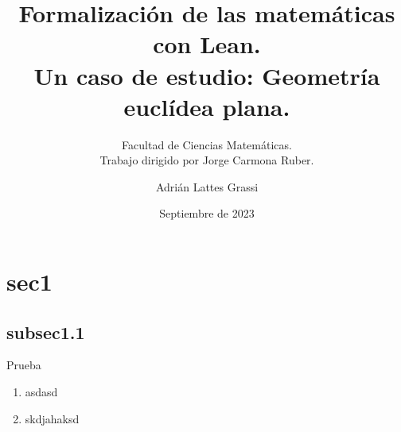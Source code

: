 \documentclass{beamer}
\title{Formalización de las matemáticas con Lean.\\ Un caso de estudio: Geometría euclídea plana.}
\author{Adrián Lattes Grassi}
\date{Septiembre de 2023}
\subtitle{Facultad de Ciencias Matemáticas.\\Trabajo dirigido por Jorge Carmona Ruber.}
\begin{document}
\frame{\titlepage}

\section{sec1}
\subsection{subsec1.1}
\begin{frame}
	Prueba
	\pause
	\vspace{.1em}
	\begin{center}
		\begin{multicols}{2}
			\begin{enumerate}
				\item asdasd
				\item skdjahaksd
			\end{enumerate}
		\end{multicols}
	\end{center}
\end{frame}
\end{document}
